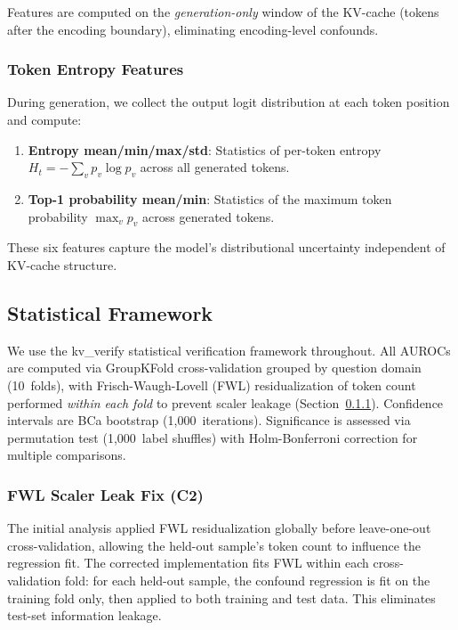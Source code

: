 \documentclass[11pt,a4paper]{article}
\begin{document}
Features are computed on the \emph{generation-only} window of the KV-cache (tokens after the encoding boundary), eliminating encoding-level confounds.

\subsubsection{Token Entropy Features}

During generation, we collect the output logit distribution at each token position and compute:

\begin{enumerate}[nosep]
    \item \textbf{Entropy mean/min/max/std}: Statistics of per-token entropy $H_t = -\sum_v p_v \log p_v$ across all generated tokens.
    \item \textbf{Top-1 probability mean/min}: Statistics of the maximum token probability $\max_v p_v$ across generated tokens.
\end{enumerate}

These six features capture the model's distributional uncertainty independent of KV-cache structure.

\subsection{Statistical Framework}
\label{sec:stats}

We use the kv\_verify statistical verification framework \citep{wilkes2026kv} throughout. All AUROCs are computed via GroupKFold cross-validation grouped by question domain (10~folds), with Frisch-Waugh-Lovell (FWL) residualization of token count performed \emph{within each fold} to prevent scaler leakage (Section~\ref{sec:c2fix}). Confidence intervals are BCa bootstrap (1{,}000~iterations). Significance is assessed via permutation test (1{,}000~label shuffles) with Holm-Bonferroni correction for multiple comparisons.

\subsubsection{FWL Scaler Leak Fix (C2)}
\label{sec:c2fix}

The initial analysis applied FWL residualization globally before leave-one-out cross-validation, allowing the held-out sample's token count to influence the regression fit. The corrected implementation fits FWL within each cross-validation fold: for each held-out sample, the confound regression is fit on the training fold only, then applied to both training and test data. This eliminates test-set information leakage.
\end{document}
